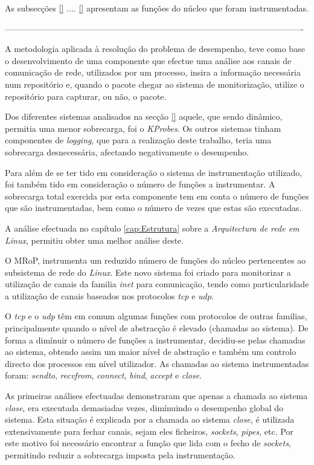 As subsecções \ref{} .... \ref{} apresentam as funções do núcleo que foram instrumentadas.

%
%

----------------------------------------------------------------------------------------------------------

A metodologia aplicada à resolução do problema de desempenho, teve como base o desenvolvimento de uma componente que efectue uma análise aos canais de comunicação de rede, utilizados por um processo, insira a informação necessária num repositório e, quando o pacote chegar ao sistema de monitorização, utilize o repositório para capturar, ou não, o pacote.

Dos diferentes sistemas analisados na secção \ref{} aquele, que sendo dinâmico, permitia uma menor sobrecarga, foi o \textit{KProbes}.
Os outros sistemas tinham componentes de \textit{logging}, que para a realização deste trabalho, teria uma sobrecarga desnecessária, afectando negativamente o desempenho.

Para além de se ter tido em consideração o sistema de instrumentação utilizado, foi também tido em consideração o número de funções a instrumentar.
A sobrecarga total exercida por esta componente tem em conta o número de funções que são instrumentadas, bem como o número de vezes que estas são executadas.

A análise efectuada no capítulo \ref{cap:Estrutura} sobre a \textit{Arquitectura de rede em Linux}, permitiu obter uma melhor análise deste.

O MRoP, instrumenta um reduzido número de funções do núcleo pertencentes ao subsistema de rede do \textit{Linux}.
Este novo sistema foi criado para monitorizar a utilização de canais da familia \textit{inet} para comunicação, tendo como particularidade a utilização de canais baseados nos protocolos \textit{tcp} e \textit{udp}.

O \textit{tcp} e o \textit{udp} têm em comum algumas funções com protocolos de outras familias, principalmente quando o nível de abstracção é elevado (chamadas ao sistema).
De forma a dimínuir o número de funções a instrumentar, decidiu-se pelas chamadas ao sistema, obtendo assim um maior nível de abstração e também um controlo directo dos processos em nível utilizador.
As chamadas ao sistema instrumentadas foram: \textit{sendto}, \textit{recvfrom}, \textit{connect}, \textit{bind}, \textit{accept} e \textit{close}.

As primeiras análises efectuadas demonstraram que apenas a chamada ao sistema \textit{close}, era executada demasiadas vezes, dimínuindo o desempenho global do sistema.
Esta situação é explicada por a chamada ao sistema \textit{close}, é utilizada extensivamente para fechar canais, sejam eles ficheiros, \textit{sockets}, \textit{pipes}, etc.
Por este motivo foi necessário encontrar a função que lida com o fecho de \textit{sockets}, permitindo reduzir a sobrecarga imposta pela instrumentação.


